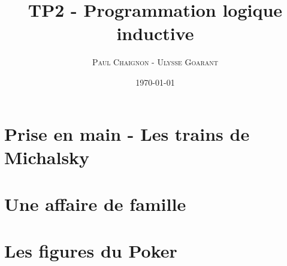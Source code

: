 \documentclass[a4paper,12pt]{article}
\title{TP2 - Programmation logique inductive}
\author{\textsc{Paul Chaignon} - \textsc{Ulysse Goarant}}
\date{\today}
\begin{document}
\maketitle

\section{Prise en main - Les trains de Michalsky}


\section{Une affaire de famille}


\section{Les figures du Poker}
\end{document}
